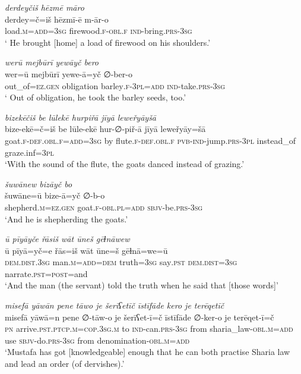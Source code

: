 \ea \label{ŽP.25}
\textit{derdeyčiš hēzmē māro} \\ 
\gll derdey=č=iš hēzmī-ē m-ār-o \\ 
 load\textsc{.m}\textsc{=add}\textsc{=3sg} firewood\textsc{.f}\textsc{-obl}\textsc{.f} \textsc{ind-}bring\textsc{.prs}\textsc{-3sg} \\ 
\glt ` He brought [home] a load of firewood on his shoulders.'
\z 
 
\ea \label{ŽP.29}
\textit{werū mejbūrī yewāyč bero} \\ 
\gll wer=ū mejbūrī yewe-ā=yč ∅-ber-o \\ 
 out\_of\textsc{\textsc{=ez.gen}} obligation barley\textsc{.f}\textsc{-3pl}\textsc{=add} \textsc{ind-}take\textsc{.prs}\textsc{-3sg} \\ 
\glt ` Out of obligation, he took the barley seeds, too.'
\z 
 
\ea \label{ŽP.37}
\textit{bizekēčiš be lūlekē hurpiřā jīyā leweřyāyšā} \\ 
\gll bize-ekē=č=iš be lūle-ekē hur-∅-piř-ā jīyā leweřyāy=šā \\ 
 goat\textsc{.f}\textsc{-def}\textsc{.obl}\textsc{.f}\textsc{=add}\textsc{=3sg} by flute\textsc{.f}\textsc{-def}\textsc{.obl}\textsc{.f} \textsc{pvb-}\textsc{ind-}jump\textsc{.prs}\textsc{-3pl} instead\_of graze.inf\textsc{=3pl} \\ 
\glt `With the sound of the flute, the goats danced instead of grazing.'
\z 
 
\ea \label{ŽP.48}
\textit{šuwānew bizāyč bo} \\ 
\gll šuwāne=ū bize-ā=yč ∅-b-o \\ 
 shepherd\textsc{.m}\textsc{\textsc{=ez.gen}} goat\textsc{.f}\textsc{-obl}\textsc{.pl}\textsc{=add} \textsc{sbjv-}be\textsc{.prs}\textsc{-3sg} \\ 
\glt `And he is shepherding the goats.'
\z 
 
\ea \label{ŽP.77}
\textit{ū pīyāyče řāsiš wāt ūneš gēɫnāwew} \\ 
\gll ū pīyā=yč=e řās=iš wāt ūne=š gēɫnā=we=ū \\ 
 \textsc{dem.dist}\textsc{.3sg} man\textsc{.m}\textsc{=add}\textsc{=dem} truth\textsc{=3sg} say\textsc{.pst} \textsc{dem.dist}\textsc{=3sg} narrate\textsc{.pst}\textsc{=\textsc{post}}=and \\ 
\glt `And the man (the servant) told the truth when he said that [those words]'
\z 
 
\ea \label{ŽP.84}
\textit{misefā yāwān pene tāwo je šerīʕetīč īstīfāde kero je terēqetīč} \\ 
\gll misefā yāwā=n pene ∅-tāw-o je šerīʕet-ī=č īstīfāde ∅-ker-o je terēqet-ī=č \\ 
 \textsc{pn} arrive\textsc{.pst}\textsc{.ptcp}\textsc{.m}\textsc{=cop}\textsc{.3sg}\textsc{.m} to \textsc{ind-}can\textsc{.prs}\textsc{-3sg} from sharia\_law\textsc{-obl}\textsc{.m}\textsc{=add} use \textsc{sbjv-}do\textsc{.prs}\textsc{-3sg} from denomination\textsc{-obl}\textsc{.m}\textsc{=add} \\ 
\glt `Mustafa has got [knowledgeable] enough that he can both practise Sharia law and lead an order (of dervishes).'
\z 
 
